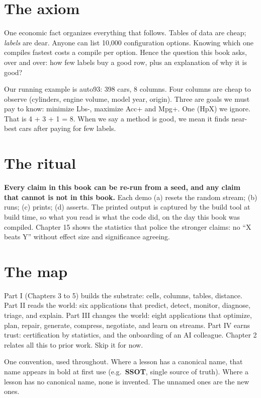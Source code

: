 \documentclass[
  justified]{tufte-book}
\begin{document}
\section{The axiom}\label{the-axiom}

One economic fact organizes everything that follows. Tables of data are
cheap; \emph{labels} are dear. Anyone can list 10,000 configuration
options. Knowing which one compiles fastest costs a compile per option.
Hence the question this book asks, over and over: how few labels buy a
good row, plus an explanation of why it is good?

Our running example is auto93: 398 cars, 8 columns. Four columns are
cheap to observe (cylinders, engine volume, model year, origin). Three
are goals we must pay to know: minimize Lbs-, maximize Acc+ and Mpg+.
One (HpX) we ignore. That is 4 + 3 + 1 = 8. When we say a method is
good, we mean it finds near-best cars after paying for few labels.

\section{The ritual}\label{the-ritual}

\textbf{Every claim in this book can be re-run from a seed, and any
claim that cannot is not in this book.} Each demo (a) resets the random
stream; (b) runs; (c) prints; (d) asserts. The printed output is
captured by the build tool at build time, so what you read is what the
code did, on the day this book was compiled. Chapter 15 shows the
statistics that police the stronger claims: no ``X beats Y'' without
effect size and significance agreeing.

\section{The map}\label{the-map}

Part I (Chapters 3 to 5) builds the substrate: cells, columns, tables,
distance. Part II reads the world: six applications that predict,
detect, monitor, diagnose, triage, and explain. Part III changes the
world: eight applications that optimize, plan, repair, generate,
compress, negotiate, and learn on streams. Part IV earns trust:
certification by statistics, and the onboarding of an AI colleague.
Chapter 2 relates all this to prior work. Skip it for now.

One convention, used throughout. Where a lesson has a canonical name,
that name appears in bold at first use (e.g.~\textbf{SSOT}, single
source of truth). Where a lesson has no canonical name, none is
invented. The unnamed ones are the new ones.
\end{document}

